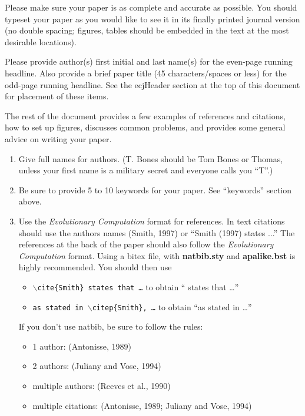 \documentclass[twoside]{article}
\begin{document}
Please make sure your paper is as complete and accurate as possible. You 
should typeset your paper as you would like to see it 
in its finally printed journal version (no double spacing; figures, tables 
should be embedded in the text at the most desirable locations). 

Please provide author(s) first initial and last name(s) for the even-page 
running headline. Also provide a brief paper title (45 characters/spaces or 
less) for the odd-page running headline.  See the ecjHeader section at the 
top of this document for placement of these items.

The rest of the document provides a few examples of references and 
citations, how to set up figures, discusses common problems, and provides some
general advice on writing your paper.

\begin{enumerate} 
    
\item
Give full names for authors.  (T. Bones should be Tom Bones or Thomas, 
unless your first name is a military secret and everyone calls you ``T''.)  

\item
Be sure to provide 5 to 10 keywords for your paper.  See ``keywords'' 
section above.

\item
Use the {\em Evolutionary Computation} format for references. In text 
citations should use the authors names (Smith, 1997) or ``Smith (1997) 
states ...''   The references at the back of the paper should also follow 
the {\em Evolutionary Computation} format. Using a bitex file, with
{\bf natbib.sty} and {\bf  apalike.bst}  is highly recommended. You
should then use 
\begin{itemize}
\item {\tt $\backslash$cite\{Smith\} states that \ldots} to obtain ``\cite{Smith} states that \ldots''
\item {\tt as stated in  $\backslash$citep\{Smith\}, \ldots} to obtain ``as stated in \citep{Smith} \ldots''
\end{itemize}

If you don't use natbib, be sure to follow the rules:

\begin{itemize}
\item 1 author: (Antonisse, 1989)
\item 2 authors: (Juliany and Vose, 1994)
\item multiple authors: (Reeves et al., 1990)
\item multiple citations: (Antonisse, 1989; Juliany and Vose, 1994) 
\end{itemize}



\end{enumerate}
\end{document}
